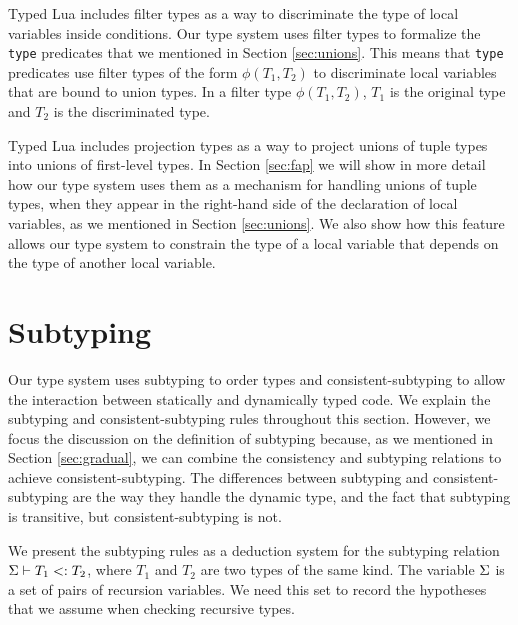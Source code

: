 Typed Lua includes filter types as a way to discriminate the type of local
variables inside conditions.
Our type system uses filter types to formalize the \texttt{type} predicates
that we mentioned in Section \ref{sec:unions}.
This means that \texttt{type} predicates use filter types of the form
$\phi(T_{1},T_{2})$ to discriminate local variables that are bound to
union types.
In a filter type $\phi(T_{1},T_{2})$, $T_{1}$ is the original type and
$T_{2}$ is the discriminated type.

Typed Lua includes projection types as a way to project
unions of tuple types into unions of first-level types.
In Section \ref{sec:fap} we will show in more detail how our type system
uses them as a mechanism for handling unions of tuple types,
when they appear in the right-hand side of the declaration of local variables,
as we mentioned in Section \ref{sec:unions}.
We also show how this feature allows our type system to constrain
the type of a local variable that depends on the type of another local variable.

\section{Subtyping}
\label{sec:subtyping}

Our type system uses subtyping \cite{cardelli1984smi,abadi1996to} to order
types and consistent-subtyping \cite{siek2007objects,siek2013mutable}
to allow the interaction between statically and dynamically typed code.
We explain the subtyping and consistent-subtyping rules throughout this section.
However, we focus the discussion on the definition of subtyping because,
as we mentioned in Section \ref{sec:gradual}, we can combine the
consistency and subtyping relations to achieve consistent-subtyping.
The differences between subtyping and consistent-subtyping are the way
they handle the dynamic type, and the fact that subtyping is transitive,
but consistent-subtyping is not.

We present the subtyping rules as a deduction system for the
subtyping relation $\Sigma \vdash T_{1} <: T_{2}$,
where $T_{1}$ and $T_{2}$ are two types of the same kind.
The variable $\Sigma$ is a set of pairs of recursion variables.
We need this set to record the hypotheses that we assume when checking
recursive types.

